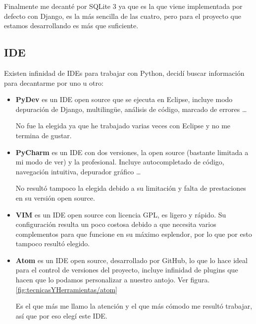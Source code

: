 Finalmente me decanté por SQLite 3 ya que es la que viene implementada por defecto con Django, es la más sencilla de las cuatro, pero para el proyecto que estamos desarrollando es más que suficiente.


\subsection{IDE}

Existen infinidad de IDEs para trabajar con Python, decidí buscar información para decantarme por uno u otro:

	\begin{itemize}
	\item \textbf{PyDev} \cite{PyDev} es un IDE open source que se ejecuta en Eclipse, incluye modo depuración de Django, multilingüe, análisis de código, marcado de errores \ldots
	
	No fue la elegida ya que he trabajado varias veces con Eclipse y no me termina de gustar.
	
	\item \textbf{PyCharm} \cite{PyCharm}  es un IDE con dos versiones, la open source (bastante limitada a mi modo de ver) y la profesional. 
	Incluye autocompletado de código, navegación intuitiva, depurador gráfico \ldots
	
	No resultó tampoco la elegida debido a su limitación y falta de prestaciones en su versión open source.
	
	\item \textbf{VIM} \cite{VIM} es un IDE open source con licencia GPL, es ligero y rápido. Su configuración resulta un poco costosa debido a que necesita varios complementos para que funcione en su máximo esplendor, por lo que por esto tampoco resultó elegido. 

	\item \textbf{Atom} \cite{Atom} es un IDE open source, desarrollado por GitHub, lo que lo hace ideal para el control de versiones del proyecto, incluye infinidad de plugins que hacen que lo podamos personalizar a nuestro antojo. Ver figura. \ref{fig:tecnicasYHerramientas/atom}
	
	Es el que más me llamo la atención y el que más cómodo me resultó trabajar, así que por eso elegí este IDE.
	
	\end{itemize}

\newpage
